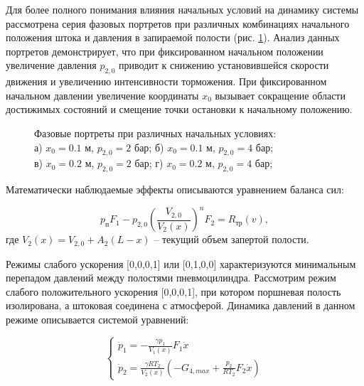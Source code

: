 Для более полного понимания влияния начальных условий на динамику системы рассмотрена серия фазовых
портретов при различных комбинациях начального положения штока и давления в запираемой
полости (рис. \ref{fig:pp_moderate_matrix}). Анализ данных портретов демонстрирует, что при
фиксированном начальном положении увеличение давления $p_{2,0}$ приводит к снижению установившейся скорости
движения и увеличению интенсивности торможения. При фиксированном начальном давлении
увеличение координаты $x_0$ вызывает сокращение области достижимых состояний и смещение точки остановки к начальному положению.

\begin{figure}[htbp]
	\caption{Фазовые портреты при различных начальных условиях: \\
		а) $x_0 = \num{0,1}$ м, $p_{2,0} = 2$ бар; б) $x_0 = \num{0.1}$ м, $p_{2,0} = 4$ бар; \\
		в) $x_0 = \num{0.2}$ м, $p_{2,0} = 2$ бар; г) $x_0 = \num{0.2}$ м, $p_{2,0} = 4$ бар;
	}
	\label{fig:pp_moderate_matrix}
\end{figure}

Математически наблюдаемые эффекты описываются уравнением баланса сил:

\begin{equation}
	p_\text{п}F_1 - p_{2,0}\left(\frac{V_{2,0}}{V_2(x)}\right)^nF_2 = R_\text{тр}(v),
\end{equation}
где $V_2(x) = V_{2,0} + A_2(L - x)$ -- текущий объем запертой полости.

Режимы слабого ускорения [0,0,0,1] или [0,1,0,0] характеризуются минимальным перепадом давлений между
полостями пневмоцилиндра. Рассмотрим режим слабого положительного ускорения [0,0,0,1], при котором поршневая полость
изолирована, а штоковая соединена с атмосферой. Динамика давлений в данном режиме описывается системой уравнений:

$$\begin{cases}
		\dot{p}_1 = -\frac{\gamma p_1}{V_1(x)}F_1\dot{x} \\
		\dot{p}_2 = \frac{\gamma RT_2}{V_2(x)}(-G_{4,max} + \frac{p_2}{RT_2}F_2\dot{x})
	\end{cases}$$


